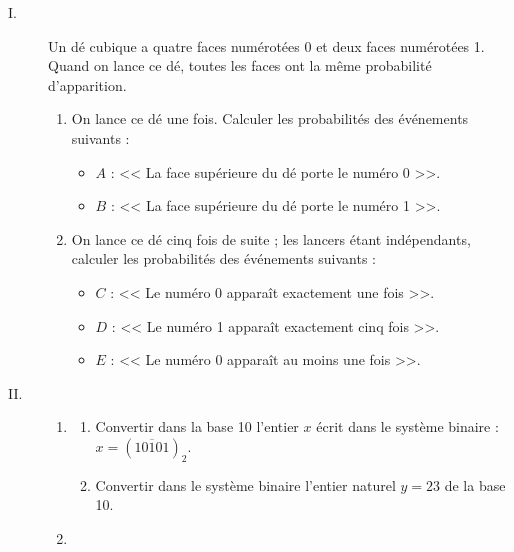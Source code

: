      \begin{description}
            \item[I. ]
                  Un dé cubique a quatre faces numérotées 0 et deux faces numérotées 1. 
                  Quand on lance ce dé, toutes les faces ont la même probabilité d’apparition. 
                  \begin{enumerate}
                        \item On lance ce dé une fois. Calculer les probabilités des événements suivants :
                              \begin{itemize}
                                    \item $A$ : << La face supérieure du dé porte le numéro 0 >>.
                                    \item $B$ : << La face supérieure du dé porte le numéro 1 >>.
                              \end{itemize}
                        \item On lance ce dé cinq fois de suite ; les lancers étant indépendants, 
                              calculer les probabilités des événements suivants :
                              \begin{itemize}
                                    \item $C$ : << Le numéro 0 apparaît exactement une fois >>.
                                    \item $D$ : << Le numéro 1 apparaît exactement cinq fois >>.
                                    \item $E$ : << Le numéro 0 apparaît au moins une fois >>.
                              \end{itemize}
                  \end{enumerate}
            \item[II. ]
                  \begin{enumerate}
                        \item \begin{enumerate}
                                    \item Convertir dans la base 10 l'entier $x$ \'ecrit dans le syst\`eme binaire : 
                                          $x = (\overline{10101})_2$.
                                    \item Convertir dans le syst\`eme binaire l'entier naturel $y = 23$ de la base 10.
                              \end{enumerate}
                        \item \begin{enumerate}

\end{enumerate}
\end{enumerate}
\end{description}
